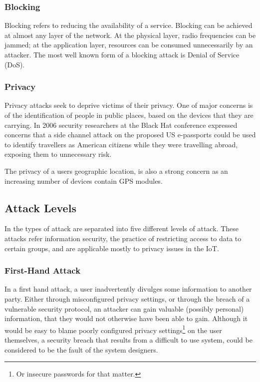 \documentclass[10pt,journal,compsoc]{IEEEtran}
\begin{document}
\subsubsection{Blocking}
Blocking refers to reducing the availability of a service. Blocking can be
achieved at almost any layer of the network. At the physical layer, radio
frequencies can be jammed; at the application layer, resources can be consumed
unnecessarily by an attacker. The most well known form of a blocking attack is
Denial of Service (DoS). 

\subsubsection{Privacy}
Privacy attacks seek to deprive victims of their privacy. One of major concerns
is of the identification of people in public places, based on the devices that
they are carrying. In 2006 security researchers at the Black Hat conference
\cite{Flexilis2006} expressed concerns that a side channel attack on the
proposed US e-passports could be used to identify travellers as American
citizens while they were travelling abroad, exposing them to unnecessary risk.

The privacy of a users geographic location, is also a strong concern as an
increasing number of devices contain GPS modules. 

\subsection{Attack Levels}
In \cite{Elkhodr2013} the types of attack are separated into five different
levels of attack. These attacks refer information security, the practice of
restricting access to data to certain groups, and are applicable mostly to
privacy issues in the IoT.

\subsubsection{First-Hand Attack}
In a first hand attack, a user inadvertently divulges some information to
another party. Either through misconfigured privacy settings, or through the
breach of a vulnerable security protocol, an attacker can gain valuable
(possibly personal) information, that they would not otherwise have been able
to gain. Although it would be easy to blame poorly configured privacy
settings\footnote{Or insecure passwords for that matter.} on the user
themselves, a security breach that results from a difficult to use system,
could be considered to be the fault of the system designers. 
\end{document}
